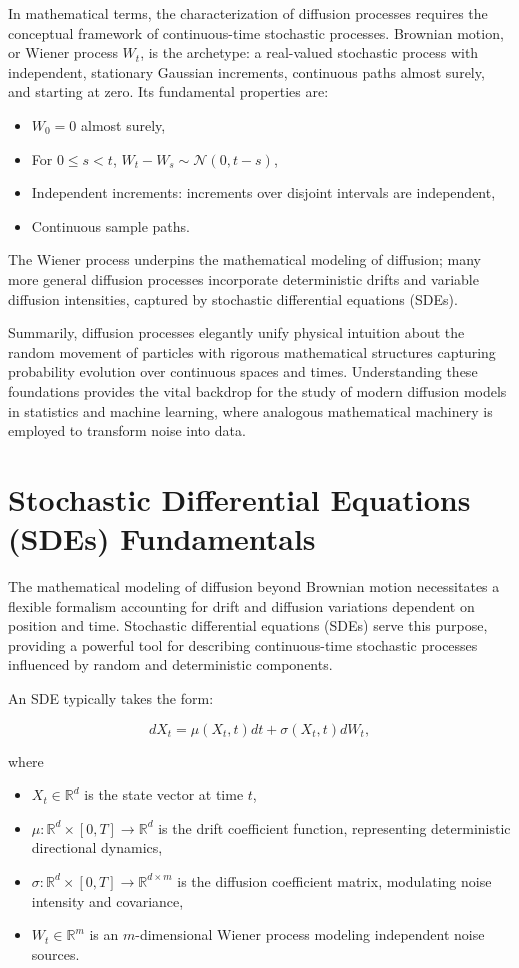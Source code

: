 In mathematical terms, the characterization of diffusion processes requires the conceptual framework of continuous-time stochastic processes. Brownian motion, or Wiener process \( W_t \), is the archetype: a real-valued stochastic process with independent, stationary Gaussian increments, continuous paths almost surely, and starting at zero. Its fundamental properties are:

\begin{itemize}
    \item \( W_0 = 0 \) almost surely,
    \item For \( 0 \leq s < t \), \( W_t - W_s \sim \mathcal{N}(0, t - s) \),
    \item Independent increments: increments over disjoint intervals are independent,
    \item Continuous sample paths.
\end{itemize}

The Wiener process underpins the mathematical modeling of diffusion; many more general diffusion processes incorporate deterministic drifts and variable diffusion intensities, captured by stochastic differential equations (SDEs). 

Summarily, diffusion processes elegantly unify physical intuition about the random movement of particles with rigorous mathematical structures capturing probability evolution over continuous spaces and times. Understanding these foundations provides the vital backdrop for the study of modern diffusion models in statistics and machine learning, where analogous mathematical machinery is employed to transform noise into data.

\section{Stochastic Differential Equations (SDEs) Fundamentals}

The mathematical modeling of diffusion beyond Brownian motion necessitates a flexible formalism accounting for drift and diffusion variations dependent on position and time. Stochastic differential equations (SDEs) serve this purpose, providing a powerful tool for describing continuous-time stochastic processes influenced by random and deterministic components.

An SDE typically takes the form:

\[
dX_t = \mu(X_t, t) dt + \sigma(X_t, t) dW_t,
\]

where

\begin{itemize}
    \item \( X_t \in \mathbb{R}^d \) is the state vector at time \( t \),
    \item \( \mu: \mathbb{R}^d \times [0,T] \to \mathbb{R}^d \) is the drift coefficient function, representing deterministic directional dynamics,
    \item \( \sigma: \mathbb{R}^d \times [0,T] \to \mathbb{R}^{d \times m} \) is the diffusion coefficient matrix, modulating noise intensity and covariance,
    \item \( W_t \in \mathbb{R}^m \) is an \( m \)-dimensional Wiener process modeling independent noise sources.
\end{itemize}

